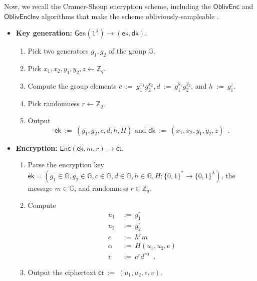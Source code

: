 \documentclass[11pt,letterpaper]{article}
\theoremstyle{plain} %
\theoremstyle{definition} %
\theoremstyle{remark} %
\newcommand{\eqdef}{\ {:=} \ }
\newcommand{\SecParam}{\lambda}
\newcommand{\Gen}{\mathsf{Gen}}
\newcommand{\Enc}{\mathsf{Enc}}
\newcommand{\OblivEnc}{\mathsf{OblivEnc}}
\newcommand{\OblivEncInv}{\mathsf{OblivEncInv}}
\newcommand{\EncKey}{\mathsf{ek}}
\newcommand{\DecKey}{\mathsf{dk}}
\newcommand{\Msg}{m}
\newcommand{\Ct}{\mathsf{ct}}
\newcommand{\Rand}{r}
\newcommand{\Bits}{\{0,1\}}
\newcommand{\Integers}{\mathbb{Z}}
\newcommand{\Group}{\mathbb{G}}
\newcommand{\GrpOrd}{q}
\newcommand{\GrpEltC}{c}
\newcommand{\GrpEltD}{d}
\newcommand{\GrpEltE}{e}
\newcommand{\GrpEltH}{h}
\newcommand{\GrpEltU}{u}
\newcommand{\GrpEltV}{v}
\newcommand{\Generator}{g}
\newcommand{\Hash}{H}
\newcommand{\ExpX}{x}
\newcommand{\ExpY}{y}
\newcommand{\ExpZ}{z}
\newcommand{\Tag}{\alpha}
\begin{document}
Now, we recall the Cramer-Shoup encryption scheme, including the $\OblivEnc$ and $\OblivEncInv$ algorithms that make the scheme obliviously-sampleable \cite{CanettiF01}.
\begin{itemize}
    \item \textbf{Key generation:} $\Gen(1^{\SecParam}) \to (\EncKey, \DecKey)$.
    \begin{enumerate}[nolistsep]
        \item Pick two generators $\Generator_1, \Generator_2$ of the group $\Group$.
        \item Pick $\ExpX_1, \ExpX_2, \ExpY_1, \ExpY_2, \ExpZ \gets \Integers_{\GrpOrd}$.
        \item Compute the group elements $\GrpEltC \eqdef \Generator_1^{\ExpX_1}\Generator_2^{\ExpX_2}, \GrpEltD \eqdef \Generator_1^{\ExpY_1}\Generator_2^{\ExpY_2}$, and $\GrpEltH \eqdef \Generator_1^{\ExpZ}$.
        \item Pick randomness $\Rand \gets \Integers_{\GrpOrd}$.
        \item Output
        \begin{equation*}
            \EncKey \eqdef (\Generator_1, \Generator_2, \GrpEltC, \GrpEltD, \GrpEltH, \Hash)
            \textrm{ and }
            \DecKey \eqdef (\ExpX_1, \ExpX_2, \ExpY_1, \ExpY_2, \ExpZ)
            \enspace.
        \end{equation*}
    \end{enumerate}

    \item \textbf{Encryption:} $\Enc(\EncKey, \Msg, \Rand) \to \Ct$.
    \begin{enumerate}[nolistsep]
        \item Parse the encryption key $\EncKey = (\Generator_1 \in \Group, \Generator_2 \in \Group, \GrpEltC\in \Group, \GrpEltD\in \Group, \GrpEltH\in \Group, \Hash \colon \Bits^{*} \to \Bits^{\SecParam})$, the message $\Msg \in \Group$, and randomness $\Rand \in \Integers_{\GrpOrd}$.
        \item Compute
        \begin{align*}
            \GrpEltU_1 &\eqdef \Generator_1^{\Rand}\\
            \GrpEltU_2 &\eqdef \Generator_2^{\Rand}\\
            \GrpEltE &\eqdef \GrpEltH^{\Rand}\Msg\\
            \Tag &\eqdef \Hash(\GrpEltU_1, \GrpEltU_2, \GrpEltE)\\
            \GrpEltV &\eqdef \GrpEltC^{\Rand}\GrpEltD^{\Rand\Tag}
            \enspace.
        \end{align*}
        \item Output the ciphertext $\Ct \eqdef (\GrpEltU_1, \GrpEltU_2, \GrpEltE, \GrpEltV)$.
    \end{enumerate}


\end{itemize}
\end{document}
